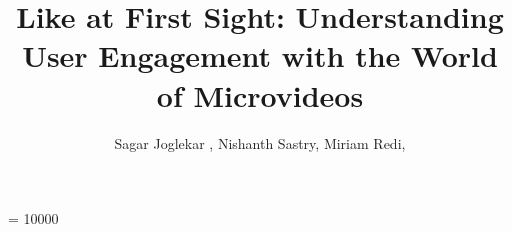 \widowpenalty = 10000



\title{Like at First Sight: Understanding User Engagement with the World of Microvideos}








\author{
Sagar Joglekar ,
Nishanth Sastry,
Miriam Redi,
}






